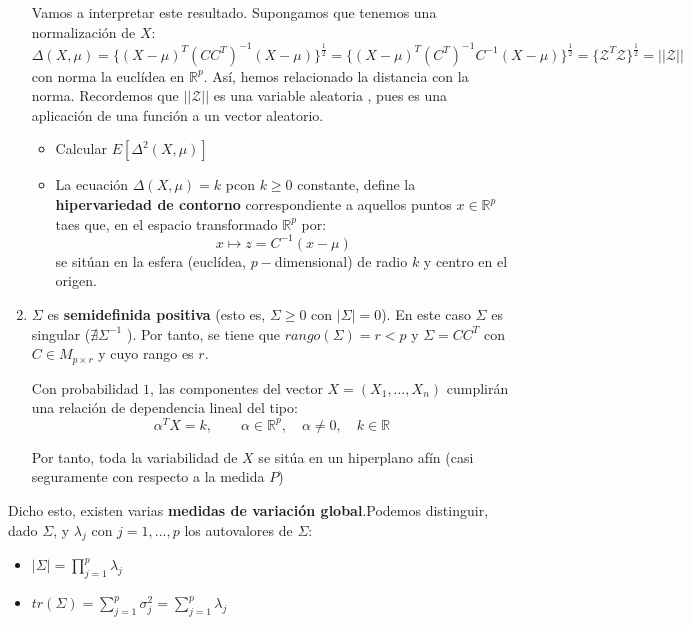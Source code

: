 \begin{enumerate}
  Vamos a interpretar este resultado. Supongamos que tenemos una normalización de $X$:
  \[
  \Delta(X,\mu) = \{ (X-\mu)^T (CC^T)^{-1}(X-\mu)\}^{\frac{1}{2}} = \{ (X-\mu)^T (C^T)^{-1}C^{-1}(X-\mu)\}^{\frac{1}{2}} = \{\mathcal Z^T \mathcal Z\}^{\frac{1}{2}} = ||\mathcal Z||
  \]
  con norma la euclídea en $\mathbb R^p$. Así, hemos relacionado la distancia con la norma. Recordemos que $||\mathcal Z||$ es una variable aleatoria , pues es una aplicación de una función a un vector aleatorio.

  \begin{nprop}
    \begin{itemize}
    \item Calcular $E[\Delta^2 (X,\mu)]$
    \item La ecuación $\Delta(X,\mu) = k$ pcon $k\geq 0$ constante, define la \textbf{hipervariedad de contorno} correspondiente a aquellos puntos $x \in \mathbb R^p$ taes que, en el espacio transformado $\mathbb R^p$ por:
      \[
      x \mapsto z = C^{-1}(x-\mu)
      \]
      se sitúan en la esfera (euclídea, $p-$dimensional) de radio $k$ y centro en el origen.
    \end{itemize}

  \end{nprop}

\item $\Sigma$ es \textbf{semidefinida positiva} (esto es, $\Sigma \geq 0$ con $|\Sigma| = 0$).  En este caso $\Sigma$ es singular ($\nexists \Sigma ^{-1} $ ). Por tanto, se tiene que $rango(\Sigma) = r < p$ y $\Sigma = C C^T$ con $C \in M_{p\times r}$ y cuyo rango es $r$.\\

  \begin{ncor}
    Con probabilidad $1$, las componentes del vector $X = (X_1, \dots, X_n)$ cumplirán una relación de dependencia lineal del tipo:
    \[
    \alpha^T X = k, \quad \quad \alpha \in \mathbb R^p, \quad \alpha \ne 0 , \quad k \in \mathbb R
    \]
    
  Por tanto, toda la variabilidad de $X$ se sitúa en un hiperplano afín (casi seguramente con respecto a la medida $P$)
  \end{ncor}

\end{enumerate}



Dicho esto, existen varias \textbf{medidas de variación global}.Podemos distinguir, dado $\Sigma$, y $\lambda_j$ con $j = 1,\dots,p$ los autovalores de $\Sigma$:
\begin{itemize}
\item $|\Sigma| =  \prod_{j=1}^p \lambda_j$
  \item $tr(\Sigma) = \sum_{j = 1}^p \sigma_j^2 = \sum_{j=1}^p \lambda_j$
\end{itemize}


